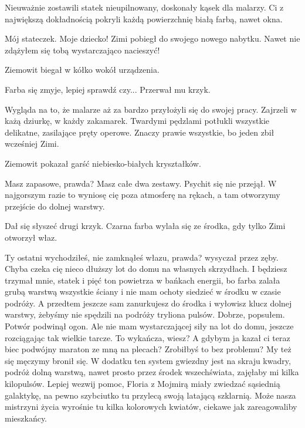 Nieuważnie zostawili statek nieupilnowany, doskonały kąsek dla malarzy.
Ci z największą dokładnością pokryli każdą powierzchnię białą farbą, nawet okna.

\begin{dialogue}
\ds{} Mój stateczek. Moje dziecko! \dm{} Zimi pobiegł do swojego nowego nabytku. \dm{} Nawet nie zdążyłem się tobą wystarczająco nacieszyć!
\end{dialogue}

Ziemowit biegał w kółko wokół urządzenia.

\begin{dialogue}
\ds{} Farba się zmyje, lepiej sprawdź czy... \dm{} Przerwał mu krzyk.
\end{dialogue}

Wygląda na to, że malarze aż za bardzo przyłożyli się do swojej pracy. 
Zajrzeli w każą dziurkę, w każdy zakamarek.
Twardymi pędzlami potłukli wszystkie delikatne, zasilające pręty operowe.
Znaczy prawie wszystkie, bo jeden zbił wcześniej Zimi.

Ziemowit pokazał garść niebiesko-białych kryształków.

\begin{dialogue}
\ds{} Masz zapasowe, prawda? Masz całe dwa zestawy. \dm{} Psychit się nie przejął. \dm{}
W najgorszym razie to wyniosę cię poza atmosferę na rękach, a tam otworzymy przejście do dolnej warstwy.
\end{dialogue}

Dał się słyszeć drugi krzyk. Czarna farba wylała się ze środka, gdy tylko Zimi otworzył właz.

\begin{dialogue}
\ds{} Ty ostatni wychodziłeś, nie zamknąłeś włazu, prawda? \dm{} wysyczał przez zęby. \dm{} Chyba czeka cię nieco dłuższy lot do domu na własnych skrzydłach. 
I będziesz trzymał mnie, statek i pięć ton powietrza w bańkach energii, bo farba zalała grubą warstwą wszystkie ściany i nie mam ochoty siedzieć w środku w czasie podróży.
A przedtem jeszcze sam zanurkujesz do środka i wyłowisz klucz dolnej warstwy, żebyśmy nie spędzili na podróży tryliona pulsów.
\ds{} Dobrze, popsułem. \dm{} Potwór podwinął ogon. \dm{} Ale nie mam wystarczającej siły na lot do domu, jeszcze rozciągając tak wielkie tarcze. To wykańcza, wiesz? 
A gdybym ja kazał ci teraz biec podwójny maraton ze mną na plecach? Zrobiłbyś to bez problemu? My też się męczymy \dm{} bronił się. \dm{} 
W dodatku ten system gwiezdny jest na skraju kwadry, podróż dolną warstwą, nawet prosto przez środek wszechświata, zajęłaby mi kilka kilopulsów. 
Lepiej wezwij pomoc, Floria z Mojmirą miały zwiedzać sąsiednią galaktykę, na pewno szybciutko tu przylecą swoją latającą szklarnią.
Może nasza mistrzyni życia wyrośnie tu kilka kolorowych kwiatów, ciekawe jak zareagowaliby mieszkańcy.
\end{dialogue}

